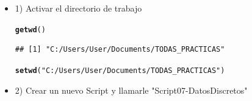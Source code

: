 \documentclass[12pt,letterpaper]{article}\usepackage[]{graphicx}\usepackage[]{color}
\makeatletter
\newcommand{\hlstr}[1]{\textcolor[rgb]{0.192,0.494,0.8}{#1}}%
\newcommand{\hlstd}[1]{\textcolor[rgb]{0.345,0.345,0.345}{#1}}%
\newcommand{\hlkwd}[1]{\textcolor[rgb]{0.737,0.353,0.396}{\textbf{#1}}}%
\newenvironment{kframe}{%
 \def\at@end@of@kframe{}%
 \ifinner\ifhmode%
  \def\at@end@of@kframe{\end{minipage}}%
  \begin{minipage}{\columnwidth}%
 \fi\fi%
 \def\FrameCommand##1{\hskip\@totalleftmargin \hskip-\fboxsep
 \colorbox{shadecolor}{##1}\hskip-\fboxsep
     \hskip-\linewidth \hskip-\@totalleftmargin \hskip\columnwidth}%
 \MakeFramed {\advance\hsize-\width
   \@totalleftmargin\z@ \linewidth\hsize
   \@setminipage}}%
 {\par\unskip\endMakeFramed%
 \at@end@of@kframe}
\newenvironment{knitrout}{}{} %
\makeatother
\begin{document}
\begin {itemize}
\item 1) Activar el directorio de trabajo
\begin{knitrout}
\color{fgcolor}\begin{kframe}
\begin{alltt}
\hlkwd{getwd}\hlstd{()}
\end{alltt}
\begin{verbatim}
## [1] "C:/Users/User/Documents/TODAS_PRACTICAS"
\end{verbatim}
\begin{alltt}
\hlkwd{setwd}\hlstd{(}\hlstr{"C:/Users/User/Documents/TODAS_PRACTICAS"}\hlstd{)}
\end{alltt}
\end{kframe}
\end{knitrout}
\item 2) Crear un nuevo Script y llamarle "Script07-DatosDiscretos"


\end{itemize}
\end{document}
